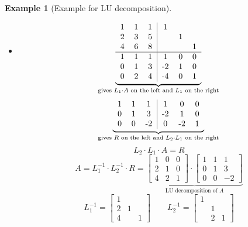 \documentclass[a4paper,landscape,twocolumn]{article}
\newtheorem{ex}{Example}
\begin{document}
\begin{ex}[Example for LU decomposition]
  \begin{itemize}
    \item
      \[
        \underbrace{
        \begin{tabular}{ccc|ccc}
          1 & 1 & 1 & 1 &   & \\
          2 & 3 & 5 &   & 1 & \\
          4 & 6 & 8 &   &   & 1 \\
        \hline
          1 & 1 & 1 & 1 & 0 & 0 \\
          0 & 1 & 3 & -2 & 1 & 0 \\
          0 & 2 & 4 & -4 & 0 & 1
        \end{tabular}
        }_{\text{gives } L_1 \cdot A \text{ on the left and } L_1 \text{ on the right}}
      \] \[
        \underbrace{
        \begin{tabular}{ccc|ccc}
          1 & 1 & 1 & 1 & 0 & 0 \\
          0 & 1 & 3 & -2 & 1 & 0 \\
          0 & 0 & -2 & 0 & -2 & 1
        \end{tabular}
        }_{\text{gives } R \text{ on the left and } L_2 \cdot L_1 \text{ on the right}}
      \]
      \[ L_2 \cdot L_1 \cdot A = R \]
      \[
        A = L_1^{-1} \cdot L_2^{-1} \cdot R
        = \underbrace{\begin{bmatrix}
          1 & 0 & 0 \\
          2 & 1 & 0 \\
          4 & 2 & 1
        \end{bmatrix} \cdot
        \begin{bmatrix}
          1 & 1 & 1 \\
          0 & 1 & 3 \\
          0 & 0 & -2
        \end{bmatrix}}_{\text{LU decomposition of $A$}}
      \]
      \[
        L_1^{-1} = \begin{bmatrix}
          1 &   &   \\
          2 & 1 &   \\
          4 &   & 1
        \end{bmatrix}
        \qquad
        L_2^{-1} = \begin{bmatrix}
          1 &   & \\
            & 1 & \\
            & 2 & 1
        \end{bmatrix}
      \]

\end{itemize}
\end{ex}
\end{document}
